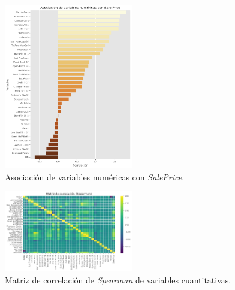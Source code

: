 \begin{figure}[ht]
	\begin{center}
	\includegraphics[width=0.5\textwidth]{figures/Asociacion de Variables Numericas con Sale Price.png}
	\caption[Asociación de variables numéricas con \textit{SalePrice}]{Asociación de variables numéricas con \textit{SalePrice}.}
	\label{fig:grafico numericas y SalePrice}
	\end{center}
\end{figure}

\begin{figure}[ht]
	\begin{center}
	\includegraphics[width=0.5\textwidth]{figures/Matriz de Correlación Spearman.png}
	\caption[Matriz de correlación de \textit{Spearman} de variables cuantitativas]{Matriz de correlación de \textit{Spearman} de variables cuantitativas.}
	\label{fig:graficocuantitativospear}
	\end{center}
\end{figure}


